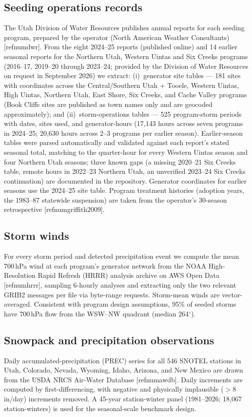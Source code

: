 \documentclass[9pt,twocolumn,twoside]{article}
\newcommand{\citeparen}[1]{[\csname refnum#1\endcsname]}
\begin{document}
\subsection{Seeding operations records}
The Utah Division of Water Resources publishes annual reports for each
seeding program, prepared by the operator (North American Weather
Consultants) \citeparen{dwr}. From the eight 2024--25 reports (published online) and 14 earlier seasonal
reports for the Northern Utah, Western Uintas and Six Creeks programs
(2016--17, 2019--20 through 2023--24; provided by the Division of Water
Resources on request in September 2026) we extract:
(i)~generator site tables --- 181 sites with coordinates across the
Central/Southern Utah + Tooele, Western Uintas, High Uintas, Northern Utah,
East Shore, Six Creeks, and Cache Valley programs (Book Cliffs sites are
published as town names only and are geocoded approximately); and
(ii)~storm-operations tables --- 525 program-storm periods with dates, sites
used, and generator-hours (17{,}143 hours across seven programs in 2024--25;
20{,}630 hours across 2--3 programs per earlier season). Earlier-season
tables were parsed automatically and validated against each report's stated
seasonal total, matching to the quarter-hour for every Western Uintas season
and four Northern Utah seasons; three known gaps (a missing 2020--21 Six
Creeks table, remote hours in 2022--23 Northern Utah, an unverified 2023--24
Six Creeks continuation) are documented in the repository. Generator
coordinates for earlier seasons use the 2024--25 site table. Program treatment histories (adoption years, the 1983--87
statewide suspension) are taken from the operator's 30-season retrospective
\citeparen{griffith2009}.

\subsection{Storm winds}
For every storm period and detected precipitation event we compute the mean
700\,hPa wind at each program's generator network from the NOAA
High-Resolution Rapid Refresh (HRRR) analysis archive on AWS Open Data
\citeparen{hrrr}, sampling 6-hourly analyses and extracting only the two
relevant GRIB2 messages per file via byte-range requests. Storm-mean winds
are vector-averaged. Consistent with program design assumptions, 95\% of
seeded storms have 700\,hPa flow from the WSW--NW quadrant (median
264$^\circ$).

\subsection{Snowpack and precipitation observations}
Daily accumulated-precipitation (PREC) series for all 546 SNOTEL stations in
Utah, Colorado, Nevada, Wyoming, Idaho, Arizona, and New Mexico are drawn
from the USDA NRCS Air-Water Database \citeparen{awdb}. Daily increments are
computed by first-differencing, with negative and physically implausible
($>$8\,in/day) increments removed. A 45-year station-winter panel
(1981--2026; 18{,}067 station-winters) is used for the seasonal-scale
benchmark design.
\end{document}
